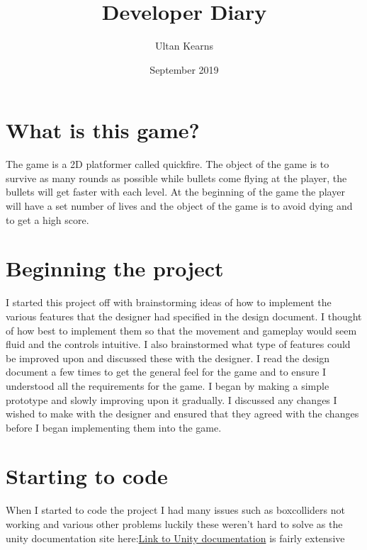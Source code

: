 \documentclass{report}
\title{Developer Diary}
\author{Ultan Kearns}
\date{September 2019}
\begin{document}
\maketitle
\tableofcontents

\section{What is this game?}

The game is a 2D platformer called quickfire.  The object of the game is 
to survive as many rounds as possible while bullets come flying at the player, the bullets will get faster with each level. At the beginning of the game the player will have a set number of lives and the object of the game is to avoid dying and to get a high score.
\section{Beginning the project}
I started this project off with brainstorming ideas of how to implement the various features that the designer had specified in the design document. I thought of how best to implement them so that the movement and gameplay would seem fluid and the controls intuitive. I also brainstormed what type of features could be improved upon and discussed these with the designer. I read the design document a few times to get the general feel for the game and to ensure I understood all the requirements for the game.  I began by making a simple prototype and slowly improving upon it gradually.  I discussed any changes I wished to make with the designer and ensured that they agreed with the changes before I began implementing them into the game.
\section{Starting to code}
When I started to code the project I had many issues such as boxcolliders not working and various other problems luckily these weren't  hard to solve as the unity documentation site here:\href{https://docs.unity3d.com/Manual/index.html}{Link to Unity documentation} is fairly extensive
\end{document}
